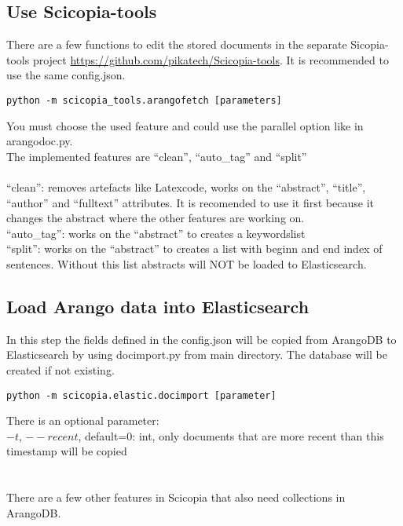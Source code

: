 \subsection{Use Scicopia-tools}
There are a few functions to edit the stored documents in the separate Sicopia-tools project \url{https://github.com/pikatech/Scicopia-tools}. It is recommended to use the same config.json.
\begin{verbatim}
python -m scicopia_tools.arangofetch [parameters]
\end{verbatim}
You must choose the used feature and could use the parallel option like in arangodoc.py.\\
The implemented features are ``clean'', ``auto\_tag'' and ``split''\\
\\
``clean'': removes artefacts like Latexcode, works on the ``abstract'', ``title'', ``author'' and ``fulltext'' attributes. It is recomended to use it first because it changes the abstract where the other features are working on.\\
``auto\_tag'': works on the ``abstract'' to creates a keywordslist\\
``split'': works on the ``abstract'' to creates a list with beginn and end index of sentences. Without this list abstracts will NOT be loaded to Elasticsearch.

\subsection{Load Arango data into Elasticsearch}
In this step the fields defined in the config.json will be copied from ArangoDB to Elasticsearch by using docimport.py from main directory. The database will be created if not existing.
\begin{verbatim}
python -m scicopia.elastic.docimport [parameter]
\end{verbatim}
There is an optional parameter:\\
$-t$, $--recent$, default=0: int, only documents that are more recent than this timestamp will be copied\\
\\
\\
There are a few other features in Scicopia that also need collections in ArangoDB.

